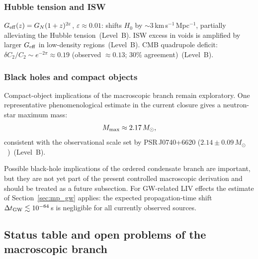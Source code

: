 \subsubsection*{Hubble tension and ISW}

$G_{\rm eff}(z)=G_N(1+z)^{2\varepsilon}$, $\varepsilon\approx 0.01$:
shifts $H_0$ by $\sim 3$\,km\,s$^{-1}$\,Mpc$^{-1}$, partially
alleviating the Hubble tension~(Level~B).
ISW excess in voids is amplified by larger $G_{\rm eff}$ in
low-density regions~(Level~B).
CMB quadrupole deficit: $\delta C_2/C_2\sim e^{-2\pi}\approx 0.19$
(observed $\approx 0.13$; 30\% agreement)~(Level~B).

\subsubsection*{Black holes and compact objects}

Compact-object implications of the macroscopic branch remain exploratory.
One representative phenomenological estimate in the current closure
gives a neutron-star maximum mass:
\begin{equation}
  \label{eq:ns_mass}
  M_{\rm max}\approx 2.17\,M_\odot,
\end{equation}
consistent with the observational scale set by PSR\,J0740+6620
($2.14\pm0.09\,M_\odot$~\cite{Cromartie2019,Riley2021})~(Level~B).

Possible black-hole implications of the ordered condensate branch are
important, but they are not yet part of the present controlled
macroscopic derivation and should be treated as a future subsection.
For GW-related LIV effects the estimate of Section~\ref{sec:mp_gw}
applies: the expected propagation-time shift
$\Delta t_{\rm GW}\lesssim 10^{-64}$\,s is negligible for all
currently observed sources.


\subsection{Status table and open problems of the
macroscopic branch}
\label{sec:mp_status}

